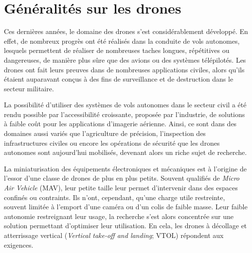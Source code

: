 \chapter{Généralités sur les drones}


Ces dernières années, le domaine des drones s'est considérablement développé. En effet, de nombreux progrès ont été réalisés dans la conduite de vols autonomes, lesquels permettent de réaliser de nombreuses taches longues, répétitives ou dangereuses, de manière plus sûre que des avions ou des systèmes télépilotés. Les drones ont fait leurs preuves dans de nombreuses applications civiles, alors qu'ils étaient auparavant conçus à des fins de surveillance et de destruction dans le secteur militaire.

La possibilité d'utiliser des systèmes de vols autonomes dans le secteur civil a été rendu possible par l'accessibilité croissante, proposée par l'industrie, de solutions à faible coût pour les applications d'imagerie aérienne. Ainsi, ce sont dans des domaines aussi variés que l'agriculture de précision,  l'inspection des infrastructures civiles ou encore les opérations de sécurité que les drones autonomes sont aujourd'hui mobilisés, devenant alors un riche sujet de recherche.

La miniaturisation des équipements électroniques et mécaniques est à l'origine de l'essor d'une classe de drones de plus en plus petits. Souvent qualifiés de \textit{Micro Air Vehicle} (MAV), leur petite taille leur permet d'intervenir dans des espaces confinés ou contraints. Ils n'ont, cependant, qu'une charge utile restreinte, souvent limitée à l'emport d'une caméra ou d'un colis de faible masse. 
Leur faible autonomie restreignant leur usage, la recherche s'est alors concentrée sur une solution permettant d'optimiser leur utilisation. En cela, les drones à décollage et atterrissage vertical (\textit{Vertical take-off and landing}; VTOL) répondent aux exigences.

